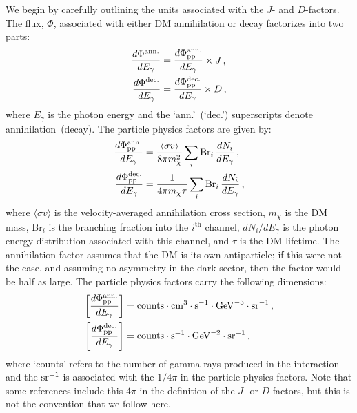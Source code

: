 We begin by carefully outlining the units associated with the $J$- and $D$-factors. 
The flux, $\Phi$, associated with either DM annihilation or decay factorizes into two parts:
\begin{equation}\begin{aligned}
\frac{d\Phi^{\rm ann.}}{dE_{\gamma}} &= \frac{d\Phi_\text{pp}^{\rm ann.}}{dE_{\gamma}}\times J \, , \\
\frac{d\Phi^{\rm dec.}}{dE_{\gamma}} &= \frac{d\Phi_\text{pp}^{\rm dec.}}{dE_{\gamma}}\times D \, ,
\end{aligned}\end{equation}
where $E_\gamma$ is the photon energy and the `ann.'~(`dec.') superscripts denote annihilation~(decay).  
The particle physics factors are given by:
\begin{equation}\begin{aligned}
\frac{d\Phi_\text{pp}^{\rm ann.}}{dE_{\gamma}} &=\frac{\langle\sigma v\rangle}{8\pi m_{\chi}^{2}}\sum_i \text{Br}_{i}\, \frac{dN_{i}}{dE_{\gamma}}\,, \\
\frac{d\Phi_\text{pp}^{\rm dec.}}{dE_{\gamma}} &=\frac{1}{4\pi m_{\chi} \tau}\sum_i \text{Br}_{i}\, \frac{dN_{i}}{dE_{\gamma}}\,,
\end{aligned}\end{equation}
where $\langle \sigma v \rangle$ is the velocity-averaged annihilation cross section, $m_\chi$ is the DM mass, Br$_i$ is the branching fraction into the $i^\text{th}$ channel, $dN_i/dE_\gamma$ is the photon energy distribution associated with this channel, and $\tau$ is the DM lifetime.  The annihilation factor assumes that the DM is its own antiparticle; if this were not the case, and assuming no asymmetry in the dark sector, then the factor would be half as large.  The particle physics factors carry the following dimensions:
\begin{equation}\begin{aligned}
\left[ \frac{d\Phi_\text{pp}^{\rm ann.}}{dE_{\gamma}} \right] &= {\rm counts} \cdot {\rm cm}^3 \cdot {\rm s}^{-1} \cdot {\rm GeV}^{-3} \cdot {\rm sr}^{-1} \,, \\
\left[ \frac{d\Phi_\text{pp}^{\rm dec.}}{dE_{\gamma}} \right] &= {\rm counts} \cdot {\rm s}^{-1} \cdot {\rm GeV}^{-2} \cdot {\rm sr}^{-1}\,,
\label{eq:ppunits}
\end{aligned}\end{equation}
where `counts' refers to the number of gamma-rays produced in the interaction and the ${\rm sr}^{-1}$ is associated with the $1/4\pi$ in the particle physics factors.  Note that some references include this $4\pi$ in the definition of the $J$- or $D$-factors, but this is not the convention that we follow here.

